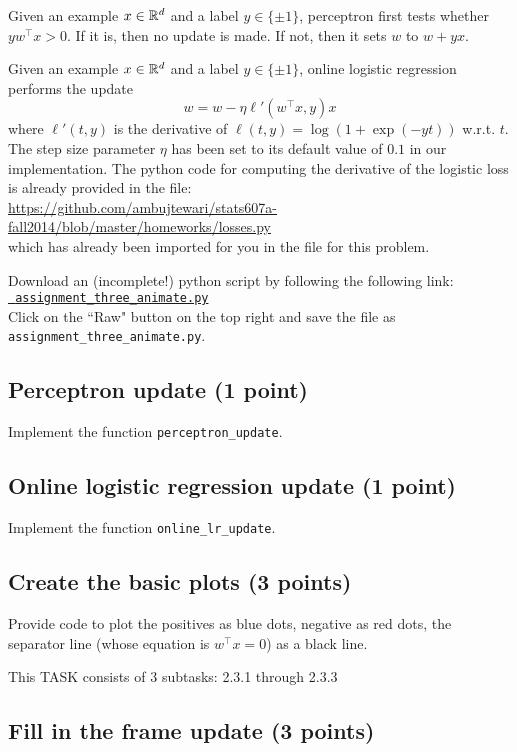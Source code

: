 \documentclass{article}
\begin{document}
Given an example $x \in \mathbb{R}^d$ and a label $y \in \{\pm 1\}$,
perceptron first tests whether $y w^\top x > 0$. If it is, then no update is made. If not, then it sets
$w$ to $w + y x$.

Given an example $x \in \mathbb{R}^d$ and a label $y \in \{\pm 1\}$,
online logistic regression performs the update
$$
w = w - \eta \ell'(w^\top x, y) x
$$
where $\ell'(t, y)$ is the derivative of $\ell(t,y) = \log(1+\exp(-yt))$ w.r.t. $t$. The step size parameter
$\eta$ has been set to its default value of $0.1$ in our implementation. The python code for computing the derivative
of the logistic loss is already provided in the file:\\
\url{https://github.com/ambujtewari/stats607a-fall2014/blob/master/homeworks/losses.py}\\
which has already been imported for you in the file for this problem.

Download an (incomplete!) python script by following the following
link:\\
\href{https://github.com/ambujtewari/stats607a-fall2014/blob/master/homeworks/assignment_three_animate.py}{\tt
assignment\_three\_animate.py} \\
Click on the ``Raw" button on the top right and save the file as {\tt
assignment\_three\_animate.py}.

\subsection{Perceptron update (1 point)}

Implement the function {\tt perceptron\_update}.

\subsection{Online logistic regression update (1 point)}

Implement the function {\tt online\_lr\_update}.

\subsection{Create the basic plots (3 points)}

Provide code to plot the positives as blue dots, negative as red dots, the separator line (whose equation is $w^\top x = 0$) as a black line.

This TASK consists of 3 subtasks: 2.3.1 through 2.3.3

\subsection{Fill in the frame update (3 points)}
\end{document}
